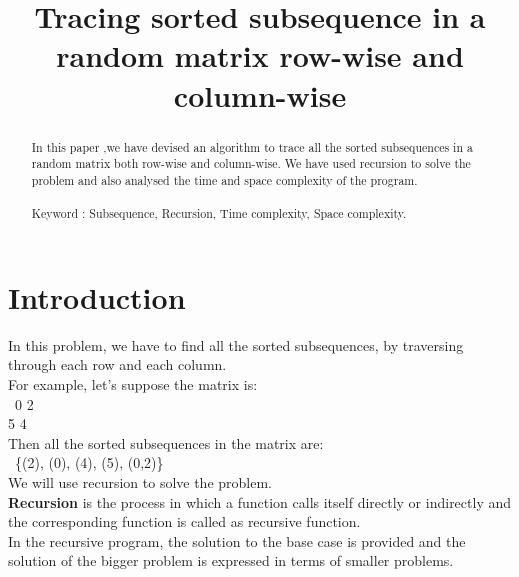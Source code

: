 \documentclass[conference]{IEEEtran}
\begin{document}
\title{
Tracing sorted subsequence in a random matrix row-wise and column-wise \\
}

\author{
\and
{}
\and
{}
}

\maketitle

\noindent \begin{abstract}

In this paper ,we have devised an algorithm to trace all the sorted subsequences in a random matrix both row-wise and column-wise. We have used recursion to solve the problem and also analysed the time and space complexity of the program.\\\\
Keyword : Subsequence, Recursion, Time complexity, Space complexity.

\end{abstract}

\section{\textbf{Introduction}}
\noindent In this problem, we have to find all the sorted subsequences, by traversing through each row and each column. \\


\noindent For example, let's suppose the matrix is: \\\
0 2 \\
5 4 \\
Then all the sorted subsequences in the matrix are:\\\
 \{(2), (0), (4), (5), (0,2)\} \\
  
\noindent We will use recursion to solve the problem.\\

\noindent \textbf{Recursion} is the process in which a function calls itself directly or indirectly and the corresponding function is called as recursive function.\\
\noindent In the recursive program, the solution to the base case is provided and the solution of the bigger problem is expressed in terms of smaller problems.\\
\end{document}
